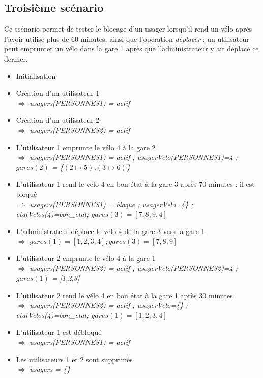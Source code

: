\documentclass[12pt]{article}
\begin{document}
\subsection{Troisième scénario}
Ce scénario permet de tester le blocage d'un usager lorsqu'il rend un vélo après l'avoir utilisé plus de 60 minutes, ainsi que l'opération \textit{déplacer} : un utilisateur peut emprunter un vélo dans la gare 1 après que l'administrateur y ait déplacé ce dernier.
\begin{itemize}
  \item Initialisation
  \item Création d'un utilisateur 1 \\
  $\Rightarrow$ \textit{usagers(PERSONNES1) = actif}
  \item Création d'un utilisateur 2 \\
  $\Rightarrow$ \textit{usagers(PERSONNES2) = actif}
  \item L'utilisateur 1 emprunte le vélo 4 à la gare 2 \\
  $\Rightarrow$ \textit{usagers(PERSONNES1) = actif ; usagerVelo(PERSONNES1)=4 ; $gares(2)$ = \{$(2\mapsto5)$,$(3\mapsto6)$\}}
  \item L'utilisateur 1 rend le vélo 4 en bon état à la gare 3 après 70 minutes : il est bloqué \\
  $\Rightarrow$ \textit{usagers(PERSONNES1) = bloque ; usagerVelo=\{\} ; etatVelos(4)=bon\_etat; $gares(3) = [7,8,9,4]$}
  \item L'administrateur déplace le vélo 4 de la gare 3 vers la gare 1 \\
  $\Rightarrow$ \textit{$gares(1) = [1,2,3,4] ; gares(3) = [7,8,9]$}
  \item L'utilisateur 2 emprunte le vélo 4 à la gare 1 \\
  $\Rightarrow$ \textit{usagers(PERSONNES2) = actif ; usagerVelo(PERSONNES2)=4 ; $gares(1)$ = [1,2,3]}
  \item L'utilisateur 2 rend le vélo 4 en bon état à la gare 1 après 30 minutes \\
  $\Rightarrow$ \textit{usagers(PERSONNES2) = actif ; usagerVelo=\{\} ; etatVelos(4)=bon\_etat; $gares(1) = [1,2,3,4]$}
  \item L'utilisateur 1 est débloqué \\
  $\Rightarrow$ \textit{usagers(PERSONNES1) = actif}
  \item Les utilisateurs 1 et 2 sont supprimés \\
  $\Rightarrow$ \textit{usagers = \{\}}
\end{itemize}
\newpage
\end{document}
